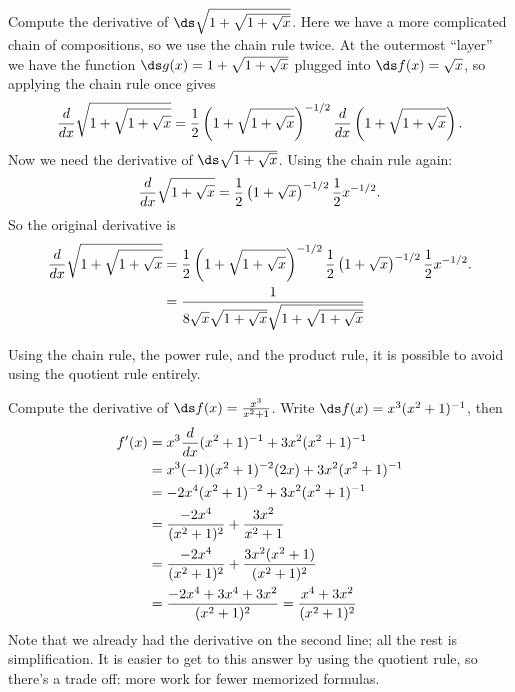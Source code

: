 \begin{example}
Compute the derivative of $\ds \sqrt{1+\sqrt{1+\sqrt{x}}}$. Here we have a
more complicated chain of compositions, so we use the chain rule
twice.
At the outermost ``layer'' we have the function
$\ds g(x)=1+\sqrt{1+\sqrt{x}}$ plugged into $\ds f(x)=\sqrt{x}$, so applying
the chain rule once gives 
$${d\over dx}\sqrt{1+\sqrt{1+\sqrt{x}}}=
{1\over 2}\left(1+\sqrt{1+\sqrt{x}}\right)^{-1/2}{d\over dx}
\left(1+\sqrt{1+\sqrt{x}}\right).$$
Now we need the derivative of $\ds \sqrt{1+\sqrt{x}}$. Using the chain
rule again:
$${d\over dx}\sqrt{1+\sqrt{x}}={1\over
  2}\left(1+\sqrt{x}\right)^{-1/2}{1\over 2}x^{-1/2}.$$
So the original derivative is 
\begin{align*}
{d\over dx}\sqrt{1+\sqrt{1+\sqrt{x}}}&=
{1\over 2}\left(1+\sqrt{1+\sqrt{x}}\right)^{-1/2}
{1\over
  2}\left(1+\sqrt{x}\right)^{-1/2}{1\over 2}x^{-1/2}. \\
&={1\over 8 \sqrt{x}\sqrt{1+\sqrt{x}}\sqrt{1+\sqrt{1+\sqrt{x}}}}
\end{align*}
\vskip -16pt
\end{example}

Using the chain rule, the power rule, and the product rule, it is
possible to avoid using the quotient rule entirely.

\begin{example}
Compute the derivative of $\ds f(x)={x^3\over x^2+1}$. Write 
$\ds f(x)=x^3(x^2+1)^{-1}$, then
\begin{align*}
f'(x)&=x^3{d\over dx}(x^2+1)^{-1}+3x^2(x^2+1)^{-1} \\
&=x^3(-1)(x^2+1)^{-2}(2x)+3x^2(x^2+1)^{-1} \\
&=-2x^4(x^2+1)^{-2}+3x^2(x^2+1)^{-1} \\
&={-2x^4\over (x^2+1)^{2}}+{3x^2\over x^2+1} \\
&={-2x^4\over (x^2+1)^{2}}+{3x^2(x^2+1)\over (x^2+1)^{2}} \\
&={-2x^4+3x^4+3x^2\over (x^2+1)^{2}}={x^4+3x^2\over (x^2+1)^{2}} \\
\end{align*}
Note that we already had the derivative on the second line; all the
rest is simplification. It is easier to get to this answer by using
the quotient rule, so there's a trade off: more work for fewer
memorized formulas.
\end{example}


